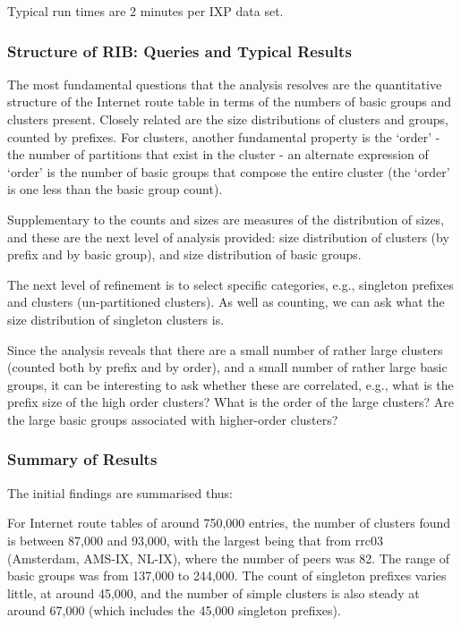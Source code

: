 Typical run times are 2 minutes per IXP data set.

\subsubsection{Structure of RIB: Queries and Typical Results}

The most fundamental questions that the analysis resolves are the quantitative structure of the Internet route table in terms of the numbers of basic groups and clusters present. Closely related are the size distributions of clusters and groups, counted by prefixes. For clusters, another fundamental property is the `order' - the number of partitions that exist in the cluster - an alternate expression of `order' is the number of basic groups that compose the entire cluster (the `order' is one less than the basic group count).

Supplementary to the counts and sizes are measures of the distribution of sizes, and these are the next level of analysis provided: size distribution of clusters (by prefix and by basic group), and size distribution of basic groups.

The next level of refinement is to select specific categories, e.g., singleton prefixes and clusters (un-partitioned clusters). As well as counting, we can ask what the size distribution of singleton clusters is.

Since the analysis reveals that there are a small number of rather large clusters (counted both by prefix and by order), and a small number of rather large basic groups, it can be interesting to ask whether these are correlated, e.g., what is the prefix size of the high order clusters? What is the order of the large clusters? Are the large basic groups associated with higher-order clusters?

\subsubsection{Summary of Results}

The initial findings are summarised thus:

For Internet route tables of around 750,000 entries, the number of clusters found is between 87,000 and 93,000, with the largest being that from rrc03 (Amsterdam, AMS-IX, NL-IX), where the number of peers was 82. The range of basic groups was from 137,000 to 244,000. The count of singleton prefixes varies little, at around 45,000, and the number of simple clusters is also steady at around 67,000 (which includes the 45,000 singleton prefixes).

